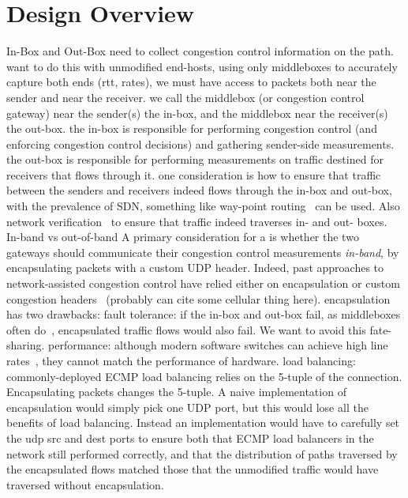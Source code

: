 \section{Design Overview}\label{s:design}
\begin{outline}
\1 In-Box and Out-Box
    \2 need to collect congestion control information on the path.
    \2 want to do this with unmodified end-hosts, using only middleboxes
    \2 to accurately capture both ends (rtt, rates), we must have access to packets both near the sender and near the receiver.
    \2 we call the middlebox (or congestion control gateway) near the sender(s) the in-box, and the middlebox near the receiver(s) the out-box.
    \2 the in-box is responsible for performing congestion control (and enforcing congestion control decisions) and gathering sender-side measurements.
    \2 the out-box is responsible for performing measurements on traffic destined for receivers that flows through it.
    \2 one consideration is how to ensure that traffic between the senders and receivers indeed flows through the in-box and out-box, with the prevalence of SDN, something like way-point routing~\cite{waypoint-routing} can be used. Also network verification~\cite{network-verification} to ensure that traffic indeed traverses in- and out- boxes.
\1 In-band vs out-of-band
    \2 A primary consideration for a \name is whether the two gateways should communicate their congestion control measurements \emph{in-band}, by encapsulating packets with \eg a custom UDP header.
    \2 Indeed, past approaches to network-assisted congestion control have relied either on encapsulation or custom congestion headers~\cite{xcp, rcp} (probably can cite some cellular thing here).
    \2 encapsulation has two drawbacks:
        \3 fault tolerance: if the in-box and out-box fail, as middleboxes often do~\cite{aplomb}, encapsulated traffic flows would also fail. We want to avoid this fate-sharing.
        \3 performance: although modern software switches can achieve high line rates~\cite{netbricks, bess}, they cannot match the performance of hardware.  
        \3 load balancing: commonly-deployed ECMP load balancing relies on the 5-tuple of the connection. Encapsulating packets changes the 5-tuple. 
            \4 A naive implementation of encapsulation would simply pick one UDP port, but this would lose all the benefits of load balancing. 
            \4 Instead an implementation would have to carefully set the udp src and dest ports to ensure both that ECMP load balancers in the network still performed correctly, and that the distribution of paths traversed by the encapsulated flows matched those that the unmodified traffic would have traversed without encapsulation.

\end{outline}
